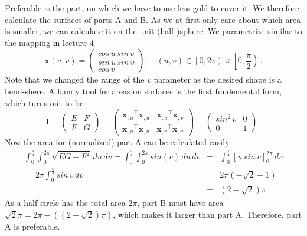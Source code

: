 \documentclass{scrartcl}
\begin{document}
Preferable is the part, on which we have to use less gold to cover it.
We therefore calculate the surfaces of parts A and B.
As we at first only care about which area is smaller, we can calculate it on the 
unit (half-)sphere.
We parametrize similar to the mapping in lecture 4
\begin{equation}
	\mathbf{x}(u,v) = 
	\begin{pmatrix}
		cos\,u\,sin\,v\\
		sin\,u\,sin\,v\\
		cos\,v
	\end{pmatrix}
	,\quad
	\left(u,v\right)\in \left[0,2\pi\right)\times \left[0,\frac{\pi}{2}\right) \, .
\end{equation}
Note that we changed the range of the $v$ parameter as the desired shape is a hemi-shere.
A handy tool for areas on surfaces is the first fundemental form, which turns out to be
\begin{equation}
	\mathbf{I} =
	\begin{pmatrix}
		E & F\\
		F & G
	\end{pmatrix}
	=
	\begin{pmatrix}
		{\mathbf{x}_{,u}}^\top{\mathbf{x}_{,u}} & {\mathbf{x}_{,u}}^\top{\mathbf{x}_{,v}}\\
		{\mathbf{x}_{,u}}^\top{\mathbf{x}_{,v}} & {\mathbf{x}_{,v}}^\top{\mathbf{x}_{,v}}
	\end{pmatrix}
	=
	\begin{pmatrix}
		sin^2\,v & 0\\
		0 & 1
	\end{pmatrix}\, .
\end{equation}
Now the area for (normalized) part A can be calculated easily
\begin{eqnarray}
	\int_0^{\frac{\pi}{4}}\int_0^{2\pi} \sqrt{EG-F^2} \, du \, dv
	=
	\int_0^{\frac{\pi}{4}}\int_0^{2\pi} sin(v) \, du \, dv
	&=&
	\int_0^{\frac{\pi}{4}}[u\,sin\,v]_0^{2\pi} \, dv \\\nonumber
	=
	2\pi\int_0^{\frac{\pi}{4}}sin\,v\,dv
	&=&
	2\pi(-\sqrt{2}+1)\\\nonumber
	&=&
	(2-\sqrt{2})\pi
\end{eqnarray}
As a half circle has the total area $2\pi$, part B must have area
$\sqrt{2}\pi=2\pi-((2-\sqrt{2})\pi)$, which makes it larger than part A.
Therefore, part A is preferable.

	
\end{document}

